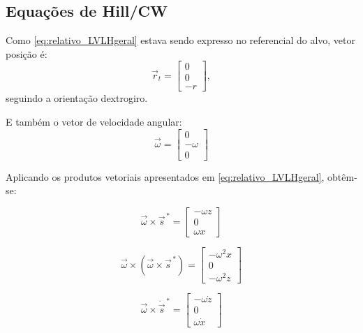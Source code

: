\subsection{Equações de Hill/CW}
\label{sec:hillcw}

Como \eqref{eq:relativo_LVLHgeral} estava sendo expresso no referencial do alvo, vetor posição é:
\begin{equation}
\label{eq:posicao_LVLH_target}
\vec r_t
=
\begin{bmatrix}
0 \\
0 \\
-r
\end{bmatrix},
\end{equation}
seguindo a orientação dextrogiro.

E também o vetor de velocidade angular:
\begin{equation}
\label{eq:velocidadeAngular_LVLH_target}
\vec\omega=
\begin{bmatrix}
0 \\
-\omega \\
0
\end{bmatrix}
\end{equation}

Aplicando os produtos vetoriais apresentados em \eqref{eq:relativo_LVLHgeral}, obtêm-se:

\begin{equation}
\label{eq:velAngular_cross_s}
\vec\omega \times \vec s^{\,*} =
\begin{bmatrix}
-\omega z \\
0         \\
\omega x
\end{bmatrix} 
\end{equation}

\begin{equation}
\label{eq:velAngular_cross_cross_s}
\vec\omega \times (\vec\omega \times \vec s^{\,*} )
=
\begin{bmatrix}
-\omega^2 x \\
0           \\
-\omega^2 z 
\end{bmatrix}
\end{equation}

\begin{equation}
\label{eq:omega_cross_dsdt}
\vec\omega \times \dot{\vec s}^{\,*} 
=
\begin{bmatrix}
-\omega \dot z \\
0 \\
\omega \dot x
\end{bmatrix}
\end{equation}

